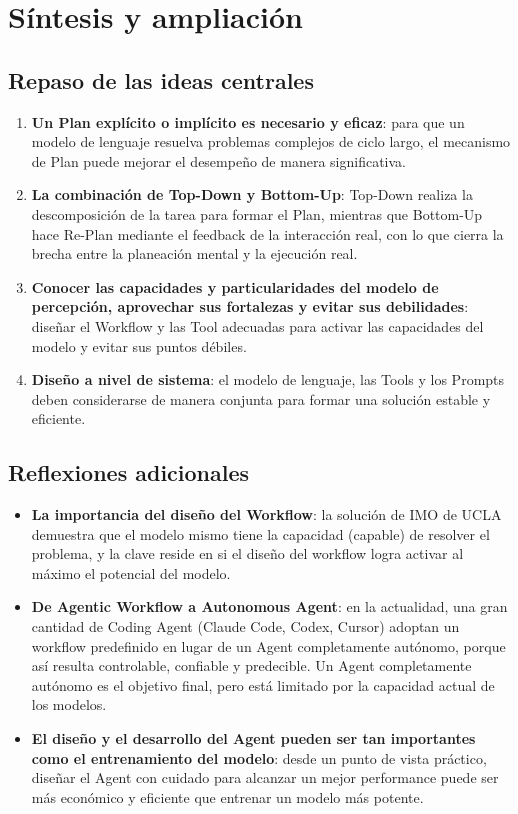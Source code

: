 \section{Síntesis y ampliación}

\subsection{Repaso de las ideas centrales}

\begin{enumerate}
    \item \textbf{Un Plan explícito o implícito es necesario y eficaz}: para que un modelo de lenguaje resuelva problemas complejos de ciclo largo, el mecanismo de Plan puede mejorar el desempeño de manera significativa.
    \item \textbf{La combinación de Top-Down y Bottom-Up}: Top-Down realiza la descomposición de la tarea para formar el Plan, mientras que Bottom-Up hace Re-Plan mediante el feedback de la interacción real, con lo que cierra la brecha entre la planeación mental y la ejecución real.
    \item \textbf{Conocer las capacidades y particularidades del modelo de percepción, aprovechar sus fortalezas y evitar sus debilidades}: diseñar el Workflow y las Tool adecuadas para activar las capacidades del modelo y evitar sus puntos débiles.
    \item \textbf{Diseño a nivel de sistema}: el modelo de lenguaje, las Tools y los Prompts deben considerarse de manera conjunta para formar una solución estable y eficiente.
\end{enumerate}

\subsection{Reflexiones adicionales}

\begin{itemize}
    \item \textbf{La importancia del diseño del Workflow}: la solución de IMO de UCLA demuestra que el modelo mismo tiene la capacidad (capable) de resolver el problema, y la clave reside en si el diseño del workflow logra activar al máximo el potencial del modelo.
    \item \textbf{De Agentic Workflow a Autonomous Agent}: en la actualidad, una gran cantidad de Coding Agent (Claude Code, Codex, Cursor) adoptan un workflow predefinido en lugar de un Agent completamente autónomo, porque así resulta controlable, confiable y predecible. Un Agent completamente autónomo es el objetivo final, pero está limitado por la capacidad actual de los modelos.
    \item \textbf{El diseño y el desarrollo del Agent pueden ser tan importantes como el entrenamiento del modelo}: desde un punto de vista práctico, diseñar el Agent con cuidado para alcanzar un mejor performance puede ser más económico y eficiente que entrenar un modelo más potente.
\end{itemize}



